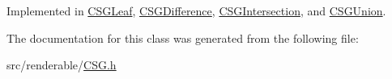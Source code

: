 Implemented in \mbox{\hyperlink{classCSGLeaf_aba3f65b725aa0a697664b9dda80b4df3}{C\+S\+G\+Leaf}}, \mbox{\hyperlink{classCSGDifference_aede15cd9fd46e4824e66361eb2f28ec9}{C\+S\+G\+Difference}}, \mbox{\hyperlink{classCSGIntersection_ad1f53a70c93dcdb6f8725a491fa24917}{C\+S\+G\+Intersection}}, and \mbox{\hyperlink{classCSGUnion_aaf1d2e77d8f931327fd8c499933142ba}{C\+S\+G\+Union}}.



The documentation for this class was generated from the following file\+:\begin{DoxyCompactItemize}
\item 
src/renderable/\mbox{\hyperlink{CSG_8h}{C\+S\+G.\+h}}\end{DoxyCompactItemize}
